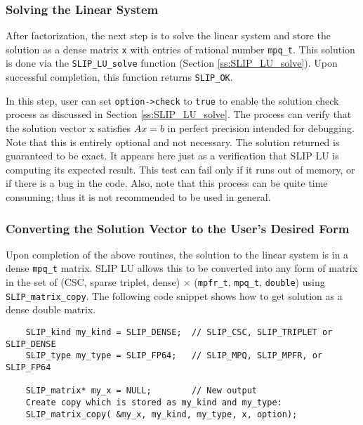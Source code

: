 \documentclass[12pt]{article}
\theoremstyle{definition}
\begin{document}
\subsubsection{Solving the Linear System}

After factorization, the next step is to solve the linear system and store the
solution as a dense matrix \verb|x| with entries of rational number
\verb|mpq_t|. This solution is done via the \verb|SLIP_LU_solve|
function (Section \ref{ss:SLIP_LU_solve}). 
Upon successful completion, this function returns \verb|SLIP_OK|.

In this step, user can set \verb|option->check| to \verb|true| to enable
the solution check process as discussed in Section \ref{ss:SLIP_LU_solve}.
The process can verify that the solution vector x satisfies $Ax=b$ in perfect
precision intended for debugging.  Note that this is entirely optional and not
necessary. The solution returned is guaranteed to be exact.   It appears here
just as a verification that SLIP LU is computing its expected result.  This
test can fail only if it runs out of memory, or if there is a bug in the code.
Also, note that this process can be quite time consuming; thus it is not
recommended to be used in general.

\subsubsection{Converting the Solution Vector to the User's Desired Form}

Upon completion of the above routines, the solution to the linear system is
in a dense \verb|mpq_t| matrix. SLIP LU allows this to be converted into any
form of matrix in the set of (CSC, sparse triplet, dense) $\times$
(\verb|mpfr_t|, \verb|mpq_t|, \verb|double|) using
\verb|SLIP_matrix_copy|. The following code snippet shows how to get solution
as a dense double matrix.

{\small
\begin{verbatim}
    SLIP_kind my_kind = SLIP_DENSE;  // SLIP_CSC, SLIP_TRIPLET or SLIP_DENSE
    SLIP_type my_type = SLIP_FP64;   // SLIP_MPQ, SLIP_MPFR, or SLIP_FP64

    SLIP_matrix* my_x = NULL;        // New output
    Create copy which is stored as my_kind and my_type:
    SLIP_matrix_copy( &my_x, my_kind, my_type, x, option);\end{verbatim} }
\end{document}
